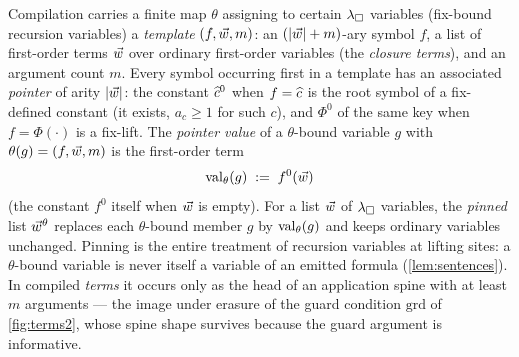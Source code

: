Compilation carries a finite map $\theta$ assigning to certain $\lambda_{\square}$
variables (fix-bound recursion variables) a \emph{template} $(f, \vec{w},
m)$: an $(|\vec{w}| + m)$-ary symbol $f$, a list of first-order terms
$\vec{w}$ over ordinary first-order variables (the \emph{closure
terms}), and an argument count $m$.  Every symbol occurring first in a
template has an associated \emph{pointer} of arity $|\vec{w}|$: the
constant $\widehat{c}^0$ when $f = \widehat{c}$ is the root symbol of a
fix-defined constant (it exists, $a_c \geq 1$ for such $c$), and
$\Phi^0$ of the same key when $f = \Phi(\cdot)$ is a fix-lift.  The
\emph{pointer value} of a $\theta$-bound variable $g$ with $\theta(g) =
(f, \vec{w}, m)$ is the first-order term
\[
  \mathrm{val}_{\theta}(g) \;\mathrel{:=}\; f^0(\vec{w})
\]
(the constant $f^0$ itself when $\vec{w}$ is empty).  For a list
$\vec{w}$ of $\lambda_{\square}$ variables, the \emph{pinned} list
$\vec{w}{}^{\theta}$ replaces each $\theta$-bound member $g$ by
$\mathrm{val}_{\theta}(g)$ and keeps ordinary variables unchanged.  Pinning is
the entire treatment of recursion variables at lifting sites: a
$\theta$-bound variable is never itself a variable of an emitted
formula (\cref{lem:sentences}).  In compiled \emph{terms} it occurs
only as the head of an application spine with at least $m$ arguments
--- the image under erasure of the guard condition $\mathrm{grd}$ of
\cref{fig:terms2}, whose spine shape survives because the guard
argument is informative.


